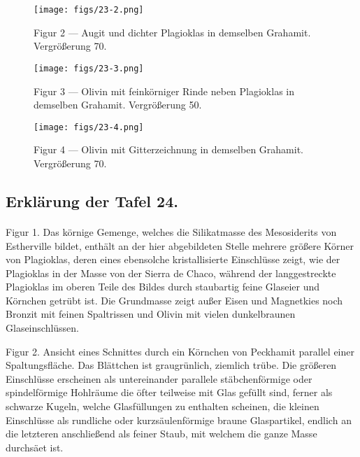 \documentclass[a4paper, 12pt, oneside]{article}
\begin{document}
\vspace*{\fill}
\begin{figure}[H]
\centering
\texttt{[image: figs/23-2.png]}
\caption{\small Figur 2 --- Augit und dichter Plagioklas in demselben Grahamit. Vergrößerung 70.}
\end{figure}
\vspace*{\fill}
\clearpage

\vspace*{\fill}
\begin{figure}[H]
\centering
\texttt{[image: figs/23-3.png]}
\caption{\small Figur 3 --- Olivin mit feinkörniger Rinde neben Plagioklas in demselben Grahamit. Vergrößerung 50.}
\end{figure}
\vspace*{\fill}
\clearpage

\vspace*{\fill}
\begin{figure}[H]
\centering
\texttt{[image: figs/23-4.png]}
\caption{\small Figur 4 --- Olivin mit Gitterzeichnung in demselben Grahamit. Vergrößerung 70.}
\end{figure}
\vspace*{\fill}
\clearpage

\subsection{Erklärung der Tafel 24.}
\paragraph{}
Figur 1. Das körnige Gemenge, welches die Silikatmasse des Mesosiderits von Estherville bildet, enthält an der hier abgebildeten Stelle mehrere größere Körner von Plagioklas, deren eines ebensolche kristallisierte Einschlüsse zeigt, wie der Plagioklas in der Masse von der Sierra de Chaco, während der langgestreckte Plagioklas im oberen Teile des Bildes durch staubartig feine Glaseier und Körnchen getrübt ist. Die Grundmasse zeigt außer Eisen und Magnetkies noch Bronzit mit feinen Spaltrissen und Olivin mit vielen dunkelbraunen Glaseinschlüssen.

Figur 2. Ansicht eines Schnittes durch ein Körnchen von Peckhamit parallel einer Spaltungsfläche. Das Blättchen ist graugrünlich, ziemlich trübe. Die größeren Einschlüsse erscheinen als untereinander parallele stäbchenförmige oder spindelförmige Hohlräume die öfter teilweise mit Glas gefüllt sind, ferner als schwarze Kugeln, welche Glasfüllungen zu enthalten scheinen, die kleinen Einschlüsse als rundliche oder kurzsäulenförmige braune Glaspartikel, endlich an die letzteren anschließend als feiner Staub, mit welchem die ganze Masse durchsäet ist.
\end{document}

